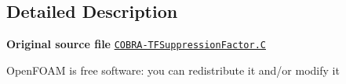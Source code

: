 \subsection{Detailed Description}
{\bfseries Original source file} \href{../../../home/carlo/data/GeN-Foam/GeN-Foam_ffn/GeN-Foam/GeN-Foam/classes/thermalHydraulics/src/physicsModels/heatTransferModels/FSHeatTransferCoefficientModels/subModels/suppressionFactorModels/COBRA-TF/COBRA-TFSuppressionFactor.C}{\tt C\+O\+B\+R\+A-\/\+T\+F\+Suppression\+Factor.\+C}

Open\+F\+O\+AM is free software\+: you can redistribute it and/or modify it 